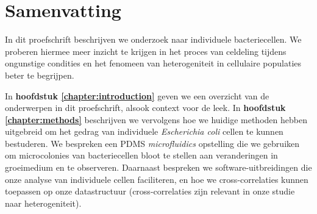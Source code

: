 
\chapter*{Samenvatting}



In dit proefschrift beschrijven we onderzoek naar individuele bacteriecellen.
We proberen hiermee meer inzicht te krijgen in het proces van celdeling tijdens ongunstige condities en
het fenomeen van heterogeniteit in cellulaire populaties beter te begrijpen.


In \textbf{hoofdstuk \ref{chapter:introduction}} geven we een overzicht van de onderwerpen in dit proefschrift,
alsook context voor de leek.
%
In \textbf{hoofdstuk \ref{chapter:methods}} beschrijven we vervolgens hoe we huidige methoden hebben uitgebreid om het gedrag van 
individuele \textit{Escherichia coli} cellen te kunnen bestuderen.
%
We bespreken een PDMS \textit{microfluidics} opstelling die we gebruiken om microcolonies van bacteriecellen bloot te stellen aan veranderingen in groeimedium en te observeren. 
Daarnaast bespreken we software-uitbreidingen die onze analyse van individuele cellen faciliteren,
en hoe we cross-correlaties kunnen toepassen op onze datastructuur (cross-correlaties zijn relevant in onze studie naar heterogeniteit).

